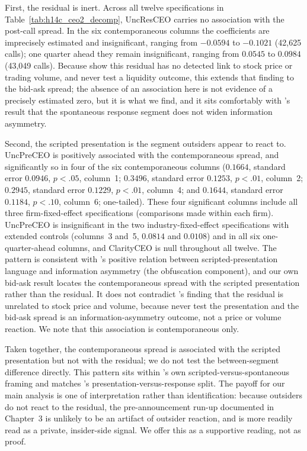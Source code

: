 First, the residual is inert. Across all twelve specifications in Table~\ref{tab:h14c_ceo2_decomp}, UncResCEO carries no association with the post-call spread. In the six contemporaneous columns the coefficients are imprecisely estimated and insignificant, ranging from $-0.0594$ to $-0.1021$ (42,625 calls); one quarter ahead they remain insignificant, ranging from $0.0545$ to $0.0984$ (43,049 calls). Because \citet{dwz} show this residual has no detected link to stock price or trading volume, and never test a liquidity outcome, this extends that finding to the bid-ask spread; the absence of an association here is not evidence of a precisely estimated zero, but it is what we find, and it sits comfortably with \citeauthor{bgt2018}'s result that the spontaneous response segment does not widen information asymmetry.

Second, the scripted presentation is the segment outsiders appear to react to. UncPreCEO is positively associated with the contemporaneous spread, and significantly so in four of the six contemporaneous columns ($0.1664$, standard error $0.0946$, $p<.05$, column~1; $0.3496$, standard error $0.1253$, $p<.01$, column~2; $0.2945$, standard error $0.1229$, $p<.01$, column~4; and $0.1644$, standard error $0.1184$, $p<.10$, column~6; one-tailed). These four significant columns include all three firm-fixed-effect specifications (comparisons made within each firm). UncPreCEO is insignificant in the two industry-fixed-effect specifications with extended controls (columns~3 and~5, $0.0814$ and $0.0108$) and in all six one-quarter-ahead columns, and ClarityCEO is null throughout all twelve. The pattern is consistent with \citeauthor{bgt2018}'s positive relation between scripted-presentation language and information asymmetry (the obfuscation component), and our own bid-ask result locates the contemporaneous spread with the scripted presentation rather than the residual. It does not contradict \citeauthor{dwz}'s finding that the residual is unrelated to stock price and volume, because \citet{dwz} never test the presentation and the bid-ask spread is an information-asymmetry outcome, not a price or volume reaction. We note that this association is contemporaneous only.

Taken together, the contemporaneous spread is associated with the scripted presentation but not with the residual; we do not test the between-segment difference directly. This pattern sits within \citeauthor{dwz}'s own scripted-versus-spontaneous framing and matches \citeauthor{bgt2018}'s presentation-versus-response split. The payoff for our main analysis is one of interpretation rather than identification: because outsiders do not react to the residual, the pre-announcement run-up documented in Chapter~3 is unlikely to be an artifact of outsider reaction, and is more readily read as a private, insider-side signal. We offer this as a supportive reading, not as proof.

